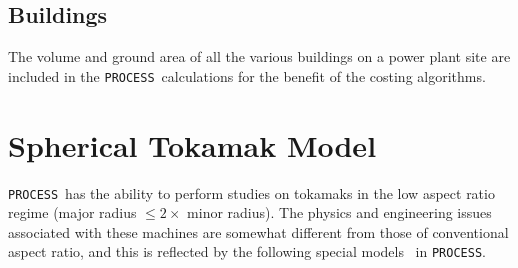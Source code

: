 \documentclass[11pt,a4paper]{report}
\newcommand{\process}{\mbox{\texttt{PROCESS}}}
\begin{document}
\subsection{Buildings}

The volume and ground area of all the various buildings on a power plant site
are included in the \process\ calculations for the benefit of the costing
algorithms. %

\section{Spherical Tokamak Model}
\label{sec:tart}

\process\ has the ability to perform studies on tokamaks in the low aspect ratio
regime (major radius $\leq 2 \times$ minor radius). The physics and
engineering issues~\cite{tart} associated with these machines are somewhat
different from those of conventional aspect ratio, and this is reflected by
the following special models~\cite{storac} in \process.
\end{document}
